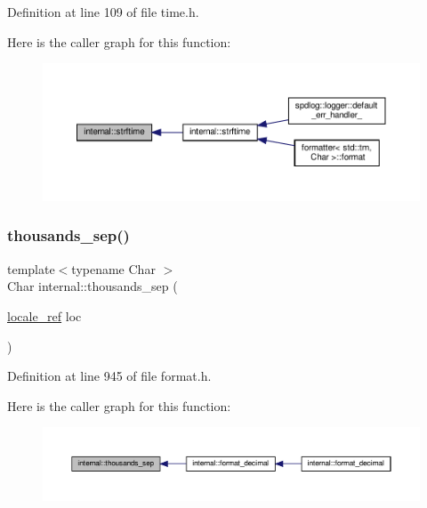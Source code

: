 Definition at line 109 of file time.\+h.

Here is the caller graph for this function\+:
\nopagebreak
\begin{figure}[H]
\begin{center}
\leavevmode
\includegraphics[width=350pt]{namespaceinternal_aaa347e326b504b866752fd087f46d2b0_icgraph}
\end{center}
\end{figure}
\mbox{\label{namespaceinternal_a604560431c478cefdd7b771e7307d0d2}} 
\subsubsection{\texorpdfstring{thousands\+\_\+sep()}{thousands\_sep()}\hspace{0.1cm}{\footnotesize\ttfamily [1/2]}}
{\footnotesize\ttfamily template$<$typename Char $>$ \\
Char internal\+::thousands\+\_\+sep (\begin{DoxyParamCaption}\item[{\hyperlink{classinternal_1_1locale__ref}{locale\+\_\+ref}}]{loc }\end{DoxyParamCaption})\hspace{0.3cm}{\ttfamily [inline]}}



Definition at line 945 of file format.\+h.

Here is the caller graph for this function\+:
\nopagebreak
\begin{figure}[H]
\begin{center}
\leavevmode
\includegraphics[width=350pt]{namespaceinternal_a604560431c478cefdd7b771e7307d0d2_icgraph}
\end{center}
\end{figure}
\mbox{\label{namespaceinternal_a1b8406f28dd9f5cba3e304c8b564db23}} 
